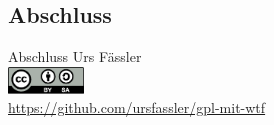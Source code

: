 
\subsection{Abschluss}
\label{sec:zusammenfassung}
\subsectionframe

\begin{frame}{Abschluss}
	Urs Fässler\\
	\includegraphics[width=2cm]{res/cc-by-sa.pdf}\\
	\url{https://github.com/ursfassler/gpl-mit-wtf}\\
	\\
	\\
\end{frame}
